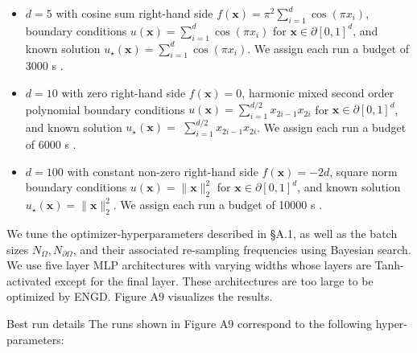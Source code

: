 \documentclass[10pt]{article}
\begin{document}
\begin{itemize}
  \item $d=5$ with cosine sum right-hand side $f(\boldsymbol{x})=\pi^{2} \sum_{i=1}^{d} \cos \left(\pi x_{i}\right)$, boundary conditions $u(\boldsymbol{x})=\sum_{i=1}^{d} \cos \left(\pi x_{i}\right)$ for $\boldsymbol{x} \in \partial[0,1]^{d}$, and known solution $u_{\star}(\boldsymbol{x})=\sum_{i=1}^{d} \cos \left(\pi x_{i}\right)$. We assign each run a budget of 3000 s .
  \item $d=10$ with zero right-hand side $f(\boldsymbol{x})=0$, harmonic mixed second order polynomial boundary conditions $u(\boldsymbol{x})=\sum_{i=1}^{d / 2} x_{2 i-1} x_{2 i}$ for $\boldsymbol{x} \in \partial[0,1]^{d}$, and known solution $u_{\star}(\boldsymbol{x})=$ $\sum_{i=1}^{d / 2} x_{2 i-1} x_{2 i}$. We assign each run a budget of 6000 s .
  \item $d=100$ with constant non-zero right-hand side $f(\boldsymbol{x})=-2 d$, square norm boundary conditions $u(\boldsymbol{x})=\|\boldsymbol{x}\|_{2}^{2}$ for $\boldsymbol{x} \in \partial[0,1]^{d}$, and known solution $u_{\star}(\boldsymbol{x})=\|\boldsymbol{x}\|_{2}^{2}$. We assign each run a budget of 10000 s .
\end{itemize}

We tune the optimizer-hyperparameters described in §A.1, as well as the batch sizes $N_{\Omega}, N_{\partial \Omega}$, and their associated re-sampling frequencies using Bayesian search. We use five layer MLP architectures with varying widths whose layers are Tanh-activated except for the final layer. These architectures are too large to be optimized by ENGD. Figure A9 visualizes the results.

Best run details The runs shown in Figure A9 correspond to the following hyper-parameters:
\end{document}
